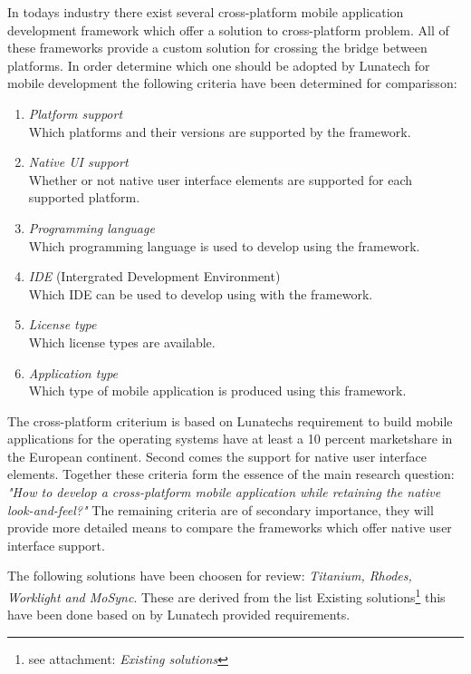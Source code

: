 In todays industry there exist several cross-platform mobile application development framework which offer a solution to cross-platform problem. All of these frameworks provide a custom solution for crossing the bridge between platforms. In order determine which one should be adopted by Lunatech for mobile development the following criteria have been determined for comparisson:

\begin{enumerate}
\item \emph{Platform support}\\
Which platforms and their versions are supported by the framework.
\item \emph{Native UI support}\\
Whether or not native user interface elements are supported for each supported platform.
\item \emph{Programming language}\\
Which programming language is used to develop using the framework.
\item \emph{IDE} (Intergrated Development Environment)\\
Which IDE can be used to develop using with the framework.
\item \emph{License type}\\
Which license types are available.
\item \emph{Application type}\\
Which type of mobile application is produced using this framework.
\end{enumerate}

The cross-platform criterium is based on Lunatechs requirement to build mobile applications for the operating systems have at least a 10 percent marketshare in the European continent. Second comes the support for native user interface elements. Together these criteria form the essence of the main research question: \emph{"How to develop a cross-platform mobile application while retaining the native look-and-feel?"}
The remaining criteria are of secondary importance, they will provide more detailed means to compare the frameworks which offer native user interface support.

The following solutions have been choosen for review: \emph{Titanium, Rhodes, Worklight and MoSync}. These are derived from the list Existing solutions\footnote{see attachment: \emph{Existing solutions}} this have been done based on by Lunatech provided requirements. %

